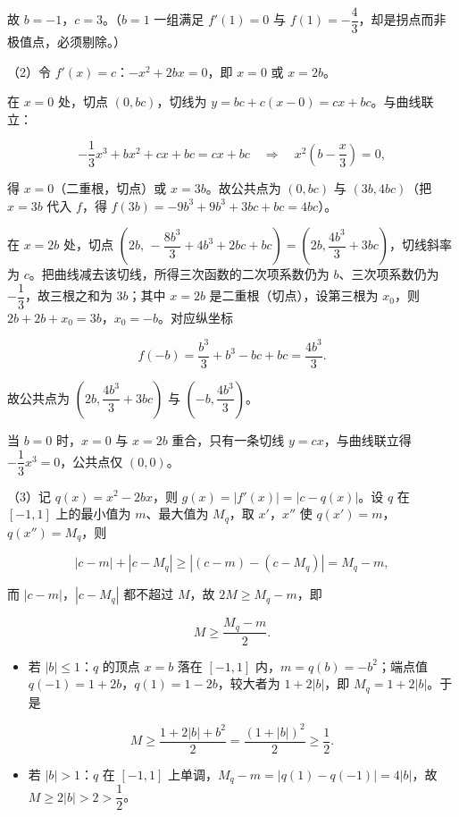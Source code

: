 \begin{answer}
故 $b=-1$，$c=3$。（$b=1$ 一组满足 $f'(1)=0$ 与 $f(1)=-\dfrac43$，却是拐点而非极值点，必须剔除。）

（2）令 $f'(x)=c$：$-x^2+2bx=0$，即 $x=0$ 或 $x=2b$。

在 $x=0$ 处，切点 $(0,bc)$，切线为 $y=bc+c(x-0)=cx+bc$。与曲线联立：

\nopagebreak[4]
\[-\frac13x^3+bx^2+cx+bc=cx+bc\quad\Longrightarrow\quad x^2\left(b-\frac x3\right)=0,\]

得 $x=0$（二重根，切点）或 $x=3b$。故公共点为 $(0,bc)$ 与 $(3b,4bc)$（把 $x=3b$ 代入 $f$，得 $f(3b)=-9b^3+9b^3+3bc+bc=4bc$）。

在 $x=2b$ 处，切点 $\left(2b,\,-\dfrac{8b^3}{3}+4b^3+2bc+bc\right)=\left(2b,\dfrac{4b^3}{3}+3bc\right)$，切线斜率为 $c$。把曲线减去该切线，所得三次函数的二次项系数仍为 $b$、三次项系数仍为 $-\dfrac13$，故三根之和为 $3b$；其中 $x=2b$ 是二重根（切点），设第三根为 $x_0$，则 $2b+2b+x_0=3b$，$x_0=-b$。对应纵坐标

\nopagebreak[4]
\[f(-b)=\frac{b^3}{3}+b^3-bc+bc=\frac{4b^3}{3}.\]

故公共点为 $\left(2b,\dfrac{4b^3}{3}+3bc\right)$ 与 $\left(-b,\dfrac{4b^3}{3}\right)$。

当 $b=0$ 时，$x=0$ 与 $x=2b$ 重合，只有一条切线 $y=cx$，与曲线联立得 $-\dfrac13x^3=0$，公共点仅 $(0,0)$。

（3）记 $q(x)=x^2-2bx$，则 $g(x)=|f'(x)|=|c-q(x)|$。设 $q$ 在 $[-1,1]$ 上的最小值为 $m$、最大值为 $M_q$，取 $x'$，$x''$ 使 $q(x')=m$，$q(x'')=M_q$，则

\nopagebreak[4]
\[|c-m|+|c-M_q|\geqslant\left|(c-m)-(c-M_q)\right|=M_q-m,\]

而 $|c-m|$，$|c-M_q|$ 都不超过 $M$，故 $2M\geqslant M_q-m$，即

\nopagebreak[4]
\[M\geqslant\frac{M_q-m}{2}.\]

\begin{itemize}
\item 若 $|b|\leqslant1$：$q$ 的顶点 $x=b$ 落在 $[-1,1]$ 内，$m=q(b)=-b^2$；端点值 $q(-1)=1+2b$，$q(1)=1-2b$，较大者为 $1+2|b|$，即 $M_q=1+2|b|$。于是
\end{itemize}

\nopagebreak[4]
\[M\geqslant\frac{1+2|b|+b^2}{2}=\frac{(1+|b|)^2}{2}\geqslant\frac12.\]

\begin{itemize}
\item 若 $|b|>1$：$q$ 在 $[-1,1]$ 上单调，$M_q-m=|q(1)-q(-1)|=4|b|$，故 $M\geqslant2|b|>2>\dfrac12$。
\end{itemize}


\end{answer}
